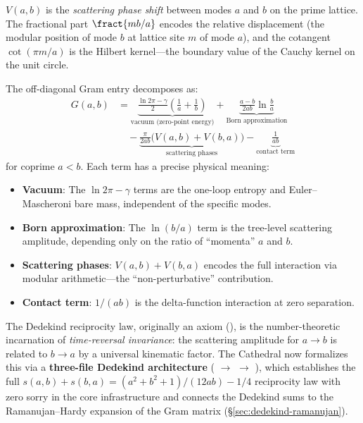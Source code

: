 \begin{correspondence}
$V(a,b)$ is the \emph{scattering phase shift} between modes
$a$ and $b$ on the prime lattice. The fractional part
$\fract{mb/a}$ encodes the relative displacement (the modular
position of mode $b$ at lattice site $m$ of mode $a$), and the
cotangent $\cot(\pi m/a)$ is the Hilbert kernel---the boundary
value of the Cauchy kernel on the unit circle.

The off-diagonal Gram entry decomposes as:
\begin{align}
  G(a,b) &= \underbrace{\frac{\ln 2\pi - \gamma}{2}\left(\frac{1}{a}+\frac{1}{b}\right)}_{\text{vacuum (zero-point energy)}}
  + \underbrace{\frac{a-b}{2ab}\ln\frac{b}{a}}_{\text{Born approximation}}
  \nonumber \\
  &\quad - \underbrace{\frac{\pi}{2ab}\bigl(V(a,b) + V(b,a)\bigr)}_{\text{scattering phases}}
  - \underbrace{\frac{1}{ab}}_{\text{contact term}}
\end{align}
for coprime $a < b$.
Each term has a precise physical meaning:
\begin{itemize}
  \item \textbf{Vacuum}: The $\ln 2\pi - \gamma$ terms are the
    one-loop entropy and Euler--Mascheroni bare mass, independent of
    the specific modes.
  \item \textbf{Born approximation}: The $\ln(b/a)$ term is the
    tree-level scattering amplitude, depending only on the ratio of
    ``momenta'' $a$ and $b$.
  \item \textbf{Scattering phases}: $V(a,b) + V(b,a)$ encodes the
    full interaction via modular arithmetic---the ``non-perturbative''
    contribution.
  \item \textbf{Contact term}: $1/(ab)$ is the delta-function
    interaction at zero separation.
\end{itemize}
\end{correspondence}

The Dedekind reciprocity law, originally an axiom (),
is the number-theoretic incarnation of \emph{time-reversal invariance}: the scattering
amplitude for $a \to b$ is related to $b \to a$ by a universal kinematic factor.
The Cathedral now formalizes this via a \textbf{three-file Dedekind architecture}
( $\to$  $\to$
), which establishes the full
$s(a,b) + s(b,a) = (a^2 + b^2 + 1)/(12ab) - 1/4$ reciprocity law with
zero sorry in the core infrastructure and connects the Dedekind sums to
the Ramanujan--Hardy expansion of the Gram matrix
(\S\ref{sec:dedekind-ramanujan}).
